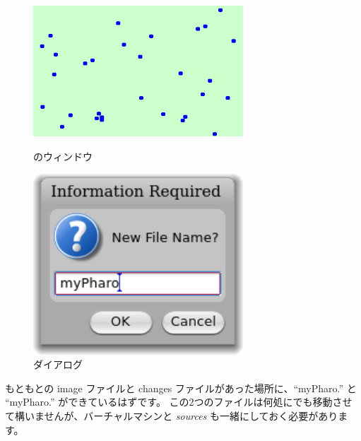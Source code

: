\documentclass[a4paper,10pt,twoside]{book}
\begin{document}

\begin{figure}[htb]
\begin{minipage}[b]{0.48\textwidth}
\centerline {\includegraphics[width=0.7\textwidth]{atoms}}
\caption{\bam のウィンドウ}
\end{minipage}
\hfill
\begin{minipage}[b]{0.48\textwidth}
\centerline {\includegraphics[width=0.7\textwidth]{saveAs}}
\caption{ ダイアログ}
\end{minipage}
\end{figure}


もともとの image ファイルと changes ファイルがあった場所に、``myPharo.'' と ``myPharo.'' ができているはずです。
この2つのファイルは何処にでも移動させて構いませんが、バーチャルマシンと \emph{sources} も一緒にしておく必要があります。
\end{document}

